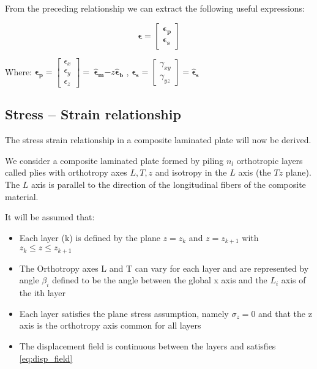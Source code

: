 From the preceding relationship we can extract the following useful expressions:

\begin{equation}
    \boldsymbol{\epsilon} = 
    \begin{bmatrix}
        \boldsymbol{\epsilon}_{\mathbf{p}} \\
        \boldsymbol{\epsilon}_{\mathbf{s}}
    \end{bmatrix}
\end{equation}

Where: 
$\boldsymbol{\epsilon}_{\mathbf{p}} = 
\begin{bmatrix}
\epsilon_{x} \\
\epsilon_{y} \\
\epsilon_{z}
\end{bmatrix} = \ {\hat{\boldsymbol{\epsilon}}}_{\mathbf{m}}\mathbf{-}z{\hat{\boldsymbol{\epsilon}}}_{\mathbf{b}}$
,\quad
$\boldsymbol{\epsilon}_{\mathbf{s}}=\begin{bmatrix}
\gamma_{xy} \\
\gamma_{yz}
\end{bmatrix}={\hat{\boldsymbol{\epsilon}}}_{\mathbf{s}}
$

\subsection{Stress -- Strain
relationship}\label{stress-strain-relationship}


The stress strain relationship in a composite laminated plate will now be derived.

We consider a composite laminated plate formed by piling $n_{l}$
orthotropic layers called plies with orthotropy axes $L,T,z$ and isotropy
in the $L$ axis (the $Tz$ plane). The $L$ axis is parallel to the direction of
the longitudinal fibers of the composite material.

It will be assumed that:

\begin{itemize}
\item
  Each layer (k) is defined by the plane $z = z_{k}$ and
  $z = z_{k + 1}$ with $z_{k} \leq z \leq z_{k + 1}$
\item
  The Orthotropy axes L and T can vary for each layer and are
  represented by angle $\beta_{i}$ defined to be the angle between the
  global x axis and the $L_{i}$ axis of the ith layer
\item
  Each layer satisfies the plane stress assumption, namely
  $\sigma_{z} = 0$ and that the z axis is the orthotropy axis common
  for all layers
\item
  The displacement field is continuous between the layers and satisfies \eqref{eq:disp_field}
\end{itemize}

